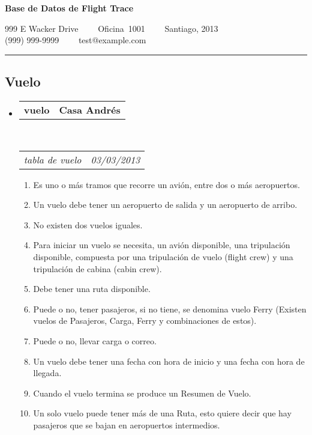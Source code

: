 \documentclass[10pt,letterpaper]{article}
\makeatletter
\newcommand{\headerrow}[2]
{\begin{tabular*}{\linewidth}{l@{\extracolsep{\fill}}r}
	#1 &
	#2 \\
\end{tabular*}}
\makeatother
\begin{document}
\begin{center}
{\LARGE \textbf{Base de Datos de Flight Trace}}

999 E Wacker Drive\ \ \textbullet
\ \ Oficina\ 1001\ \ \textbullet
\ \ Santiago, 2013
\\
(999) 999-9999\ \ \textbullet
\ \ test@example.com
\end{center}

\hrule
\vspace{-0.4em}

\subsection*{Vuelo}

\begin{itemize}
	\parskip=0.1em

	\item
	\headerrow
		{\textbf{vuelo}}
		{\textbf{Casa Andrés}}
	\\
	\headerrow
		{\emph{tabla de vuelo}}
		{\emph{03/03/2013}}
	\begin{enumerate}
		\item Es uno o más tramos que recorre un avión, entre dos o más aeropuertos.
		\item Un vuelo debe tener un aeropuerto de salida y un aeropuerto de arribo.
		\item No existen dos vuelos iguales.
		\item Para iniciar un vuelo se necesita, un avión disponible, una tripulación disponible, compuesta por una tripulación de vuelo (flight crew) y una tripulación de cabina (cabin crew).
		\item Debe tener una ruta disponible.
		\item Puede o no, tener pasajeros, si no tiene, se denomina vuelo Ferry (Existen vuelos de Pasajeros, Carga, Ferry y combinaciones de estos).
		\item Puede o no, llevar carga o correo.
		\item Un vuelo debe tener una fecha con hora de inicio y una fecha con hora de llegada.
		\item Cuando el vuelo termina se produce un Resumen de Vuelo.
		\item Un solo vuelo puede tener más de una Ruta, esto quiere decir que hay pasajeros que se bajan en aeropuertos intermedios.
	\end{enumerate}

\end{itemize}
\end{document}
